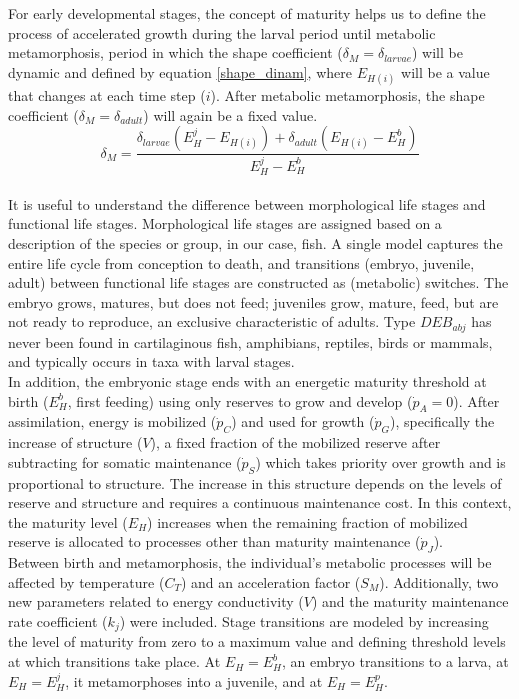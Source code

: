For early developmental stages, the concept of maturity helps us to define the process of accelerated growth during the larval period until metabolic metamorphosis, period in which the shape coefficient ($\delta_{M} = \delta_{larvae}$) will be dynamic and defined by equation \ref{shape_dinam}, where $E_{H(i)}$ will be a value that changes at each time step ($i$). After metabolic metamorphosis, the shape coefficient ($\delta_{M} = \delta_{adult}$) will again be a fixed value.\\

\begin{equation}
	\delta_M = \frac{\delta_{larvae} (E_H^j - E_{H(i)}) + \delta_{adult} (E_{H(i)} - E_H^b)}
	{E_H^j - E_H^b}
	\label{shape_dinam}
\end{equation}\\

It is useful to understand the difference between morphological life stages and functional life stages. Morphological life stages are assigned based on a description of the species or group, in our case, fish. A single model captures the entire life cycle from conception to death, and transitions (embryo, juvenile, adult) between functional life stages are constructed as (metabolic) switches. The embryo grows, matures, but does not feed; juveniles grow, mature, feed, but are not ready to reproduce, an exclusive characteristic of adults. Type $DEB_{abj}$ has never been found in cartilaginous fish, amphibians, reptiles, birds or mammals, and typically occurs in taxa with larval stages.\\

In addition, the embryonic stage ends with an energetic maturity threshold at birth ($E_{H}^{b}$, first feeding) using only reserves to grow and develop ($\dot{p}_{A} = 0$). After assimilation, energy is mobilized ($\dot{p}_{C}$) and used for growth ($\dot{p}_{G}$), specifically the increase of structure ($V$), a fixed fraction of the mobilized reserve after subtracting for somatic maintenance ($\dot{p}_{S}$) which takes priority over growth and is proportional to structure. The increase in this structure depends on the levels of reserve and structure and requires a continuous maintenance cost. In this context, the maturity level ($E_{H}$) increases when the remaining fraction of mobilized reserve is allocated to processes other than maturity maintenance ($\dot{p}_{J}$).\\

Between birth and metamorphosis, the individual's metabolic processes will be affected by temperature ($C_{T}$) and an acceleration factor ($S_{M}$). Additionally, two new parameters related to energy conductivity ($V$) and the maturity maintenance rate coefficient ($k_{j}$) were included. Stage transitions are modeled by increasing the level of maturity from zero to a maximum value and defining threshold levels at which transitions take place. At $E_{H} = E_{H}^{b}$, an embryo transitions to a larva, at $E_{H} = E_{H}^{j}$, it metamorphoses into a juvenile, and at $E_{H} = E_{H}^{p}$.\\

